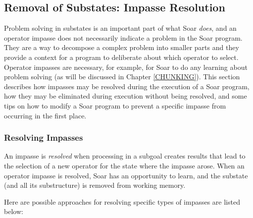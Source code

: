 \subsection{Removal of Substates: Impasse Resolution}
\label{ARCH-impasses-elimination}

Problem solving in substates is an important part of what Soar \textit{does}, and an operator impasse does not necessarily indicate a problem in the Soar program.  They are a way to decompose a complex problem into smaller parts and they provide a context for a program to deliberate about which operator to select.  Operator impasses are necessary, for example, for Soar to do any learning about problem solving (as will be discussed in Chapter \ref{CHUNKING}). This section describes how impasses may be resolved during the execution of a Soar program, how they may be eliminated during execution without being resolved, and some tips on how to modify a Soar program to prevent a specific impasse from occurring in the first place.  

\subsubsection*{Resolving Impasses}

An impasse is \textit{resolved} when processing in a subgoal creates results that lead to the selection of a new operator for the state where the impasse arose. When an operator impasse is resolved, Soar has an opportunity to learn, and the substate (and all its substructure) is removed from working memory.

Here are possible approaches for resolving specific types of impasses are listed below:

